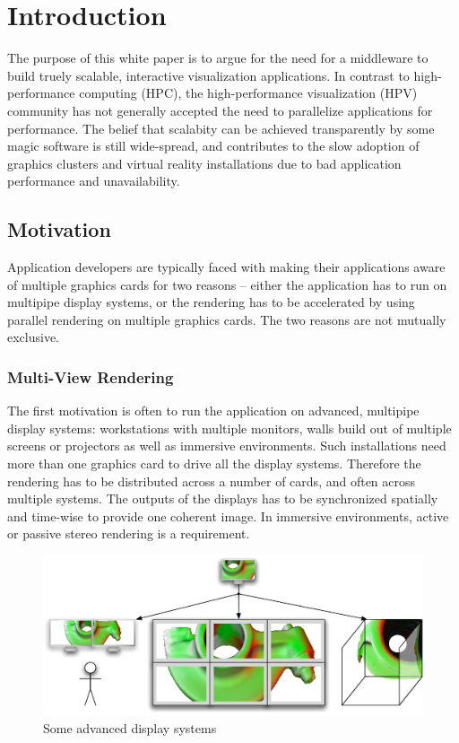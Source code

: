 \documentclass[10pt,a4paper]{scrartcl}
\begin{document}
\section{Introduction}

The purpose of this white paper is to argue for the need for a middleware to
build truely scalable, interactive visualization applications. In
contrast to high-performance computing (HPC), the high-performance
visualization (HPV) community has not generally accepted the need to
parallelize applications for performance. The belief that scalabity can be
achieved transparently by some magic software is still wide-spread, and
contributes to the slow adoption of graphics clusters and virtual reality
installations due to bad application performance and unavailability.


\subsection{Motivation}
Application developers are typically faced with making their applications
aware of multiple graphics cards for two reasons -- either the
application has to run on multipipe display systems, or the rendering has
to be accelerated by using parallel rendering on multiple graphics
cards. The two reasons are not mutually exclusive.

\subsubsection{Multi-View Rendering}
The first motivation is often to run the application on advanced,
multipipe display systems: workstations with multiple monitors, walls
build out of multiple screens or projectors as well as immersive
environments. Such installations need more than one graphics card to
drive all the display systems. Therefore the rendering has to be
distributed across a number of cards, and often across multiple
systems. The outputs of the displays has to be synchronized spatially
and time-wise to provide one coherent image. In immersive environments,
active or passive stereo rendering is a requirement.

\begin{figure}[ht]
\centering
\includegraphics[width=0.9\columnwidth]{images/sp_to_mp.pdf}
\caption{Some advanced display systems}
\label{FIG_multipipe}
\end{figure}
\end{document}

